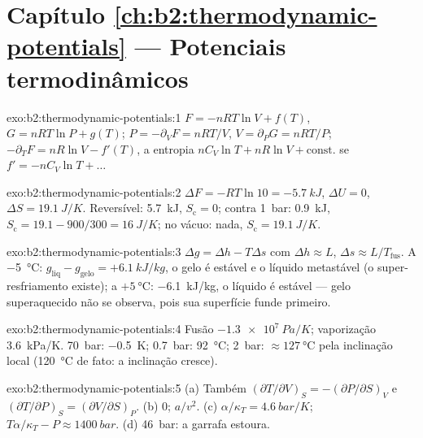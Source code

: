 \section*{Capítulo \ref{ch:b2:thermodynamic-potentials} --- Potenciais termodinâmicos}

\begin{solution}{exo:b2:thermodynamic-potentials:1}
$F = -nRT\ln V + f(T)$, $G = nRT\ln P + g(T)$; $P = -\partial_VF = nRT/V$,
$V = \partial_PG = nRT/P$; $-\partial_TF = nR\ln V - f'(T)$, a entropia
$nC_V\ln T + nR\ln V + \text{const.}$ se $f' = -nC_V\ln T + \dots$
\end{solution}

\begin{solution}{exo:b2:thermodynamic-potentials:2}
$\Delta F = -RT\ln 10 = \qty{-5.7}{kJ}$, $\Delta U = 0$, $\Delta S = \qty{19.1}{J/K}$.
Reversível: \qty{5.7}{kJ}, $S_{\text{c}} = 0$; contra \qty{1}{bar}: \qty{0.9}{kJ},
$S_{\text{c}} = 19.1 - 900/300 = \qty{16}{J/K}$; no vácuo: nada, $S_{\text{c}} =
\qty{19.1}{J/K}$.
\end{solution}

\begin{solution}{exo:b2:thermodynamic-potentials:3}
$\Delta g = \Delta h - T\Delta s$ com $\Delta h \approx L$, $\Delta s \approx L/T_{\text{fus}}$.
A \qty{-5}{\celsius}: $g_{\text{liq}} - g_{\text{gelo}} = +\qty{6.1}{kJ/kg}$, o gelo é
estável e o líquido metastável (o super-resfriamento existe); a $+\qty{5}{\celsius}$:
\qty{-6.1}{kJ/kg}, o líquido é estável --- gelo superaquecido não se observa, pois sua
superfície funde primeiro.
\end{solution}

\begin{solution}{exo:b2:thermodynamic-potentials:4}
Fusão $\qty{-1.3e7}{Pa/K}$; vaporização \qty{3.6}{kPa/K}. \qty{70}{bar}:
\qty{-0.5}{K}; \qty{0.7}{bar}: \qty{92}{\celsius}; \qty{2}{bar}: $\approx
\qty{127}{\celsius}$ pela inclinação local (\qty{120}{\celsius} de fato: a
inclinação cresce).
\end{solution}

\begin{solution}{exo:b2:thermodynamic-potentials:5}
(a) Também $(\partial T/\partial V)_S = -(\partial P/\partial S)_V$ e
$(\partial T/\partial P)_S = (\partial V/\partial S)_P$. (b) $0$; $a/v^2$. (c)
$\alpha/\kappa_T = \qty{4.6}{bar/K}$; $T\alpha/\kappa_T - P \approx \qty{1400}{bar}$.
(d) \qty{46}{bar}: a garrafa estoura.
\end{solution}

